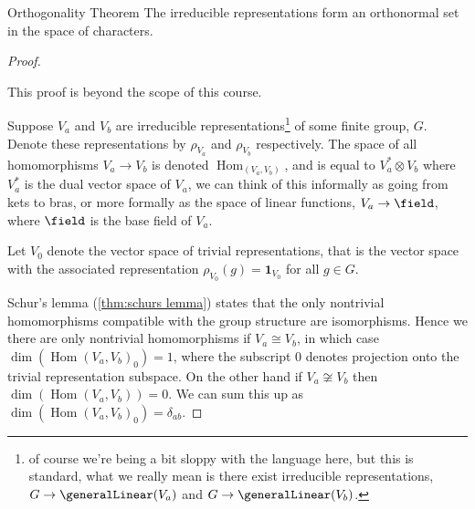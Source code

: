 \documentclass[fleqn]{NotesClass}
\newcommand*{\isomorphic}{\cong}
\newcommand*{\ident}{\mathbf{1}}
\newcommand*{\directproduct}{\otimes}
\DeclareMathOperator{\Hom}{Hom}
\begin{document}
    \begin{thm}{Orthogonality Theorem}{}
        The irreducible representations form an orthonormal set in the space of characters.
        
        \begin{proof}
            \begin{rmk}
                This proof is beyond the scope of this course.
            \end{rmk}
            \vspace{1ex}
            Suppose \(V_a\) and \(V_b\) are irreducible representations\footnote{of course we're being a bit sloppy with the language here, but this is standard, what we really mean is there exist irreducible representations, \(G \to \generalLinear(V_a)\) and \(G \to \generalLinear(V_b)\).} of some finite group, \(G\).
            Denote these representations by \(\rho_{V_a}\) and \(\rho_{V_b}\) respectively.
            The space of all homomorphisms \(V_a \to V_b\) is denoted \(\Hom_(V_a, V_b)\), and is equal to \(V_a^* \directproduct V_b\) where \(V_a^*\) is the dual vector space of \(V_a\), we can think of this informally as going from kets to bras, or more formally as the space of linear functions, \(V_a \to \field\), where \(\field\) is the base field of \(V_a\).
            
            Let \(V_0\) denote the vector space of trivial representations, that is the vector space with the associated representation \(\rho_{V_0}(g) = \ident_{V_0}\) for all \(g \in G\).
            
            Schur's lemma (\cref{thm:schurs lemma}) states that the only nontrivial homomorphisms compatible with the group structure are isomorphisms.
            Hence we there are only nontrivial homomorphisms if \(V_a \isomorphic V_b\), in which case \(\dim(\Hom(V_a, V_b)_0) = 1\), where the subscript 0 denotes projection onto the trivial representation subspace.
            On the other hand if \(V_a \not\isomorphic V_b\) then \(\dim(\Hom(V_a, V_b)) = 0\).
            We can sum this up as \(\dim(\Hom(V_a, V_b)_0) = \delta_{ab}\).
            

\end{proof}
\end{thm}
\end{document}
